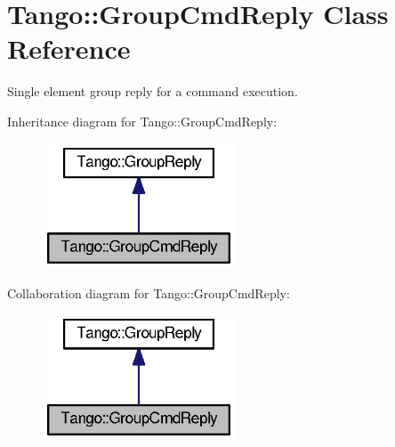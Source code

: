 \section{Tango\-:\-:Group\-Cmd\-Reply Class Reference}
\label{classTango_1_1GroupCmdReply}


Single element group reply for a command execution.  




Inheritance diagram for Tango\-:\-:Group\-Cmd\-Reply\-:
\nopagebreak
\begin{figure}[H]
\begin{center}
\leavevmode
\includegraphics[width=162pt]{d7/d24/classTango_1_1GroupCmdReply__inherit__graph}
\end{center}
\end{figure}


Collaboration diagram for Tango\-:\-:Group\-Cmd\-Reply\-:
\nopagebreak
\begin{figure}[H]
\begin{center}
\leavevmode
\includegraphics[width=162pt]{d1/da7/classTango_1_1GroupCmdReply__coll__graph}
\end{center}
\end{figure}
